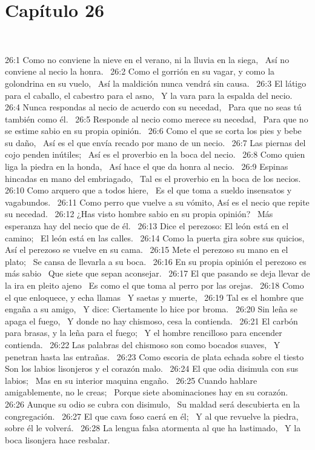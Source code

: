 \section*{Capítulo 26} 

26:1 Como no conviene la nieve en el verano, ni la lluvia en la siega,  
Así no conviene al necio la honra.  
26:2 Como el gorrión en su vagar, y como la golondrina en su vuelo,  
Así la maldición nunca vendrá sin causa.  
26:3 El látigo para el caballo, el cabestro para el asno,  
Y la vara para la espalda del necio.  
26:4 Nunca respondas al necio de acuerdo con su necedad,  
Para que no seas tú también como él.  
26:5 Responde al necio como merece su necedad,  
Para que no se estime sabio en su propia opinión.  
26:6 Como el que se corta los pies y bebe su daño,  
Así es el que envía recado por mano de un necio.  
26:7 Las piernas del cojo penden inútiles;  
Así es el proverbio en la boca del necio.  
26:8 Como quien liga la piedra en la honda,  
Así hace el que da honra al necio.  
26:9 Espinas hincadas en mano del embriagado,  
Tal es el proverbio en la boca de los necios.  
26:10 Como arquero que a todos hiere,  
Es el que toma a sueldo insensatos y vagabundos.  
26:11 Como perro que vuelve a su vómito, 
Así es el necio que repite su necedad.  
26:12 ¿Has visto hombre sabio en su propia opinión?  
Más esperanza hay del necio que de él.  
26:13 Dice el perezoso: El león está en el camino;  
El león está en las calles.  
26:14 Como la puerta gira sobre sus quicios,  
Así el perezoso se vuelve en su cama.  
26:15 Mete el perezoso su mano en el plato;  
Se cansa de llevarla a su boca.  
26:16 En su propia opinión el perezoso es más sabio  
Que siete que sepan aconsejar.  
26:17 El que pasando se deja llevar de la ira en pleito ajeno  
Es como el que toma al perro por las orejas.  
26:18 Como el que enloquece, y echa llamas  
Y saetas y muerte,  
26:19 Tal es el hombre que engaña a su amigo,  
Y dice: Ciertamente lo hice por broma.  
26:20 Sin leña se apaga el fuego,  
Y donde no hay chismoso, cesa la contienda.  
26:21 El carbón para brasas, y la leña para el fuego;  
Y el hombre rencilloso para encender contienda.  
26:22 Las palabras del chismoso son como bocados suaves,  
Y penetran hasta las entrañas.  
26:23 Como escoria de plata echada sobre el tiesto  
Son los labios lisonjeros y el corazón malo.  
26:24 El que odia disimula con sus labios;  
Mas en su interior maquina engaño.  
26:25 Cuando hablare amigablemente, no le creas;  
Porque siete abominaciones hay en su corazón.  
26:26 Aunque su odio se cubra con disimulo,  
Su maldad será descubierta en la congregación.  
26:27 El que cava foso caerá en él;  
Y al que revuelve la piedra, sobre él le volverá.  
26:28 La lengua falsa atormenta al que ha lastimado,  
Y la boca lisonjera hace resbalar.  
